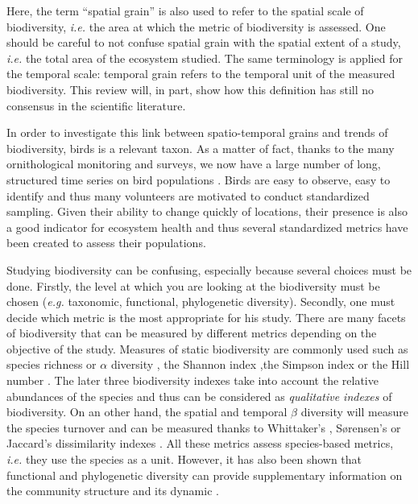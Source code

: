 \documentclass[
  12pt,
  oneside]{report}
\begin{document}
Here, the term ``spatial grain'' is also used to refer to the spatial scale of biodiversity, \emph{i.e.} the area at which the metric of biodiversity is assessed. One should be careful to not confuse spatial grain with the spatial extent of a study, \emph{i.e.} the total area of the ecosystem studied. The same terminology is applied for the temporal scale: temporal grain refers to the temporal unit of the measured biodiversity. This review will, in part, show how this definition has still no consensus in the scientific literature.

In order to investigate this link between spatio-temporal grains and trends of biodiversity, birds is a relevant taxon. As a matter of fact, thanks to the many ornithological monitoring and surveys, we now have a large number of long, structured time series on bird populations \autocites{bejcek_velke_2016,sauer_north_2013,kamp_population_2021}. Birds are easy to observe, easy to identify and thus many volunteers are motivated to conduct standardized sampling. Given their ability to change quickly of locations, their presence is also a good indicator for ecosystem health and thus several standardized metrics have been created to assess their populations.

Studying biodiversity can be confusing, especially because several choices must be done. Firstly, the level at which you are looking at the biodiversity must be chosen (\emph{e.g.} taxonomic, functional, phylogenetic diversity). Secondly, one must decide which metric is the most appropriate for his study. There are many facets of biodiversity that can be measured by different metrics depending on the objective of the study. Measures of static biodiversity are commonly used such as species richness or \(\alpha\) diversity \autocite[\emph{i.e.} number of species,][]{whittaker_vegetation_1960}, the Shannon index \autocite{shannon_mathematical_1948} ,the Simpson index \autocite{simpson_measurement_1949} or the Hill number \autocite{hill_diversity_1973}. The later three biodiversity indexes take into account the relative abundances of the species and thus can be considered as \emph{qualitative indexes} of biodiversity. On an other hand, the spatial and temporal \(\beta\) diversity will measure the species turnover and can be measured thanks to Whittaker's \autocite{whittaker_evolution_1972}, Sørensen's \autocite{sorensen_method_1948} or Jaccard's \autocite{jaccard_distribution_1912} dissimilarity indexes \autocite[\emph{e.g.}][]{keil_patterns_2012}. All these metrics assess species-based metrics, \emph{i.e.} they use the species as a unit. However, it has also been shown that functional and phylogenetic diversity can provide supplementary information on the community structure and its dynamic \autocites[\emph{e.g.}][]{mcgill_rebuilding_2006,mouquet_ecophylogenetics_2012,webb_phylogenies_2002}.
\end{document}
